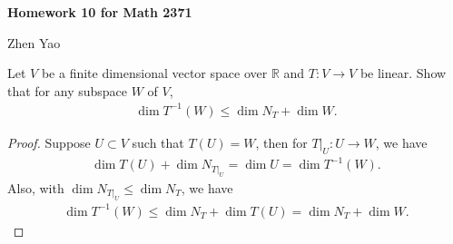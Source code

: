 \documentclass[12pt]{article}
\begin{document}
\centerline{\bf Homework 10 for Math 2371}
\centerline{Zhen Yao}

\medskip

Let $V$ be a finite dimensional vector space over $\mathbb{R}$ and $T: V \to V$ be linear. Show that for any subspace $W$ of $V$,
\begin{align*}
    \dim T^{-1}(W) \leq \dim N_T + \dim W.
\end{align*}
\begin{proof}
Suppose $U \subset V$ such that $T(U) = W$, then for $T|_U:U \to W$, we have
\begin{align*}
    \dim T(U) + \dim N_{T|_U} = \dim U = \dim T^{-1}(W).
\end{align*}
Also, with $\dim N_{T|_U} \leq \dim N_T$, we have
\begin{align*}
    \dim T^{-1}(W) \leq \dim N_T + \dim T(U) = \dim N_T + \dim W.
\end{align*}
\end{proof}

\medskip
\end{document}
